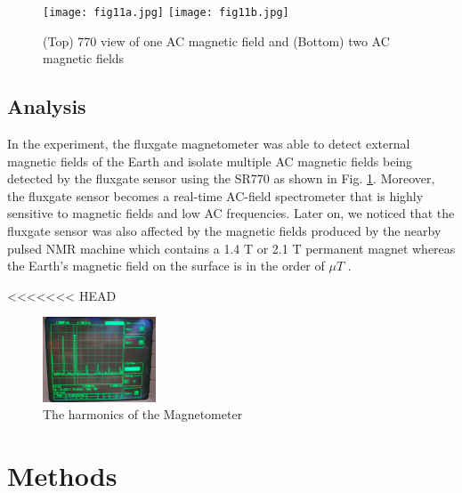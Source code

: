 \documentclass[prl,twocolumn,superscriptaddress,floatfix]{revtex4}
\begin{document}
\begin{figure}[H]
    \begin{center}
    \texttt{[image: fig11a.jpg]}
    \texttt{[image: fig11b.jpg]}
    \caption{\label{fig:11} (Top) 770 view of one AC magnetic field and (Bottom) two AC magnetic fields}
    \end{center}
\end{figure}
\subsection{Analysis}

In the experiment, the fluxgate magnetometer was able to detect external magnetic fields of the Earth and isolate multiple AC magnetic fields being detected by the fluxgate sensor using the SR770 as shown in Fig. \ref{fig:11}. Moreover, the fluxgate sensor becomes a real-time AC-field spectrometer that is highly sensitive to magnetic fields and low AC frequencies.
Later on, we noticed that the fluxgate sensor was also affected by the magnetic fields produced by the nearby pulsed NMR machine which contains a 1.4 T or 2.1 T permanent magnet whereas the Earth's magnetic field on the surface is in the order of $\mu T$ \cite{Cornell2000}.

<<<<<<< HEAD
\begin{figure}[H]
    \centering
    \includegraphics[width=0.3\textwidth]{Magnetometer Data.jpg}
    \caption{The harmonics of the Magnetometer}
    \label{fig:enter-label}
\end{figure}

\section{Methods}
\end{document}
